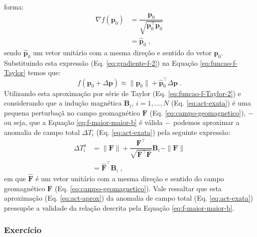 \documentclass[10pt,a4paper,fleqn]{article}
\begin{document}
forma:
\begin{equation}
\begin{split}
\nabla f(\mathbf{p}_{0}) & = 
\dfrac{\mathbf{p}_{0}}{\sqrt{\mathbf{p}_{0}^{\intercal} \mathbf{p}_{0}}} \\
                         & = \hat{\mathbf{p}}_{0} \; ,
\end{split}
\label{eq:gradiente-f-2}
\end{equation}
sendo $\hat{\mathbf{p}}_{0}$ um vetor unit\'{a}rio com a mesma direç\~{a}o e sentido
do vetor $\mathbf{p}_{0}$. Substituindo esta express\~{a}o (Eq. \ref{eq:gradiente-f-2})
na Equaç\~{a}o \ref{eq:funcao-f-Taylor} temos que:
\begin{equation}
f(\mathbf{p}_{0} + \Delta\mathbf{p}) \approx
\| \mathbf{p}_{0} \| + 
\hat{\mathbf{p}}_{0}^{\intercal} \Delta\mathbf{p} \; .
\label{eq:funcao-f-Taylor-2}
\end{equation}
Utilizando esta aproximaç\~{a}o por s\'{e}rie de Taylor (Eq. \ref{eq:funcao-f-Taylor-2})
e considerando que a induç\~{a}o magn\'{e}tica $\mathbf{B}_{i}$, $i=1,...,N$ (Eq. 
\ref{eq:act-exata}) \'{e} uma pequena perturbaç\~{a} no campo geomagn\'{e}tico 
$\mathbf{F}$ (Eq. \ref{eq:campo-geomagnetico}), $\--$ ou seja, que a Equaç\~{a}o
\ref{eq:f-maior-maior-b} \'{e} v\'{a}lida $\--$ podemos aproximar a anomalia de campo
total $\Delta T_{i}$ (Eq. \ref{eq:act-exata}) pela seguinte express\~{a}o:
\begin{equation}
\begin{split}
\Delta T_{i}^{a} & = \| \mathbf{F}\| + \dfrac{\mathbf{F}^{\intercal}}
                     {\sqrt{\mathbf{F}^{\intercal} \mathbf{F}}} 
                     \mathbf{B}_{i} - \| \mathbf{F} \| \\
                 & = \hat{\mathbf{F}}^{\intercal} \mathbf{B}_{i} \; ,
\end{split}
\label{eq:act-aprox}
\end{equation}
em que $\hat{\mathbf{F}}$ é um vetor unit\'{a}rio com a mesma direç\~{a}o e sentido
do campo geomagn\'{e}tico $\mathbf{F}$ (Eq. \ref{eq:campo-geomagnetico}). Vale
ressaltar que esta aproximaç\~{a}o (Eq. \ref{eq:act-aprox}) da anomalia de campo 
total (Eq. \ref{eq:act-exata}) pressup\~{o}e a validade da relaç\~{a}o descrita pela
Equaç\~{a}o \ref{eq:f-maior-maior-b}. 

\begin{flushleft}
\dotfill
\end{flushleft}

\subsubsection{Exerc\'{i}cio}
\end{document}
